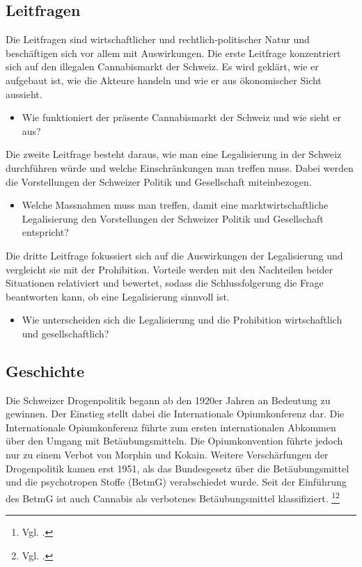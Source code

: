 \documentclass[../main.tex]{subfiles}
\begin{document}
	 \subsection{Leitfragen}
	 Die Leitfragen sind wirtschaftlicher und rechtlich-politischer Natur und beschäftigen sich vor allem mit Auswirkungen.
	 Die erste Leitfrage konzentriert sich auf den illegalen Cannabismarkt der Schweiz.
	 Es wird geklärt, wie er aufgebaut ist, wie die Akteure handeln und wie er aus ökonomischer Sicht aussieht.\vspace{0.3cm}
	 \begin{itemize}
	 	\item Wie funktioniert der präsente Cannabismarkt der Schweiz und wie sieht er aus?
	 \end{itemize}\vspace{0.3cm}
	 
	 \noindent
	 Die zweite Leitfrage besteht daraus, wie man eine Legalisierung in der Schweiz durchführen würde und welche Einschränkungen man treffen muss.
	 Dabei werden die Vorstellungen der Schweizer Politik und Gesellschaft miteinbezogen.\vspace{0.3cm}
	 \begin{itemize}
	 	\item Welche Massnahmen muss man treffen, damit eine marktwirtschaftliche Legalisierung den Vorstellungen der Schweizer Politik und Gesellschaft entspricht?
	 \end{itemize}\vspace{0.5cm}
	 
	 \noindent
	 Die dritte Leitfrage fokussiert sich auf die Auswirkungen der Legalisierung und vergleicht sie mit der Prohibition. 
	 Vorteile werden mit den Nachteilen beider Situationen relativiert und bewertet, sodass die Schlussfolgerung die Frage beantworten kann, ob eine Legalisierung sinnvoll ist.\vspace{0.3cm}
	 \begin{itemize}	 
	 	\item Wie unterscheiden sich die Legalisierung und die Prohibition wirtschaftlich und gesellschaftlich?
	 \end{itemize}
	
	 
	 \subsection{Geschichte}
	 Die Schweizer Drogenpolitik begann ab den 1920er Jahren an Bedeutung zu gewinnen. 
	 Der Einstieg stellt dabei die Internationale Opiumkonferenz dar. 
	 Die Internationale Opiumkonferenz führte zum ersten internationalen Abkommen über den Umgang mit Betäubungsmitteln. 
	 Die Opiumkonvention führte jedoch nur zu einem Verbot von Morphin und Kokain. 
	 Weitere Verschärfungen der Drogenpolitik kamen erst 1951, als das Bundesgesetz über die Betäubungsmittel und die psychotropen Stoffe (BetmG) verabschiedet wurde.
	 Seit der Einführung des BetmG ist auch Cannabis als verbotenes Betäubungsmittel klassifiziert.%
	 \footnote{Vgl. \cite{brassel}.}\footnote{Vgl. \cite{admin-01}.}\\
	 	 
\end{document}
